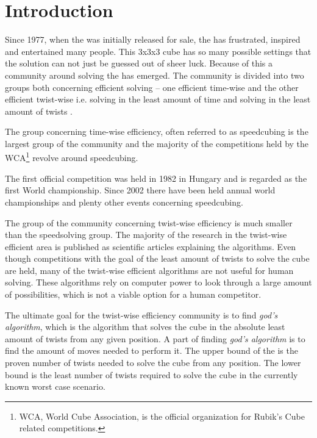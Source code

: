 \chapter{Introduction}
\emptyTop{}
Since 1977, when the \rubik{} was initially released for sale, the \rubik{} has frustrated, inspired and entertained many people. This 3x3x3 cube has so many possible settings that the solution can not just be guessed out of sheer luck. Because of this a community around solving the \rubik{} has emerged. The community is divided into two groups both concerning efficient solving -- one efficient time-wise and the other efficient twist-wise i.e. solving in the least amount of time and solving in the least amount of twists \cite{speedsolving.forum}. 

The group concerning time-wise efficiency, often referred to as speedcubing is the largest group of the community and the majority of the competitions held by the WCA\footnote{WCA, World Cube Association, is the official organization for Rubik's Cube related competitions.} \cite{wca} revolve around speedcubing.

The first official competition was held in 1982 in Hungary and is regarded as the first World championship. Since 2002 there have been held annual world championships and plenty other events concerning speedcubing. 

The group of the community concerning twist-wise efficiency is much smaller than the speedsolving group. The majority of the research in the twist-wise efficient area is published as scientific articles explaining the algorithms. Even though competitions with the goal of the least amount of twists to solve the cube are held, many of the twist-wise efficient algorithms are not useful for human solving. These algorithms rely on computer power to look through a large amount of possibilities, which is not a viable option for a human competitor.


The ultimate goal for the twist-wise efficiency community is to find \textit{god's algorithm}, which is the algorithm that solves the cube in the absolute least amount of twists from any given position. A part of finding \textit{god's algorithm} is to find the amount of moves needed to perform it. 
The upper bound of the \rubik{} is the proven number of twists needed to solve the cube from any position. The lower bound is the least number of twists required to solve the cube in the currently known worst case scenario. 